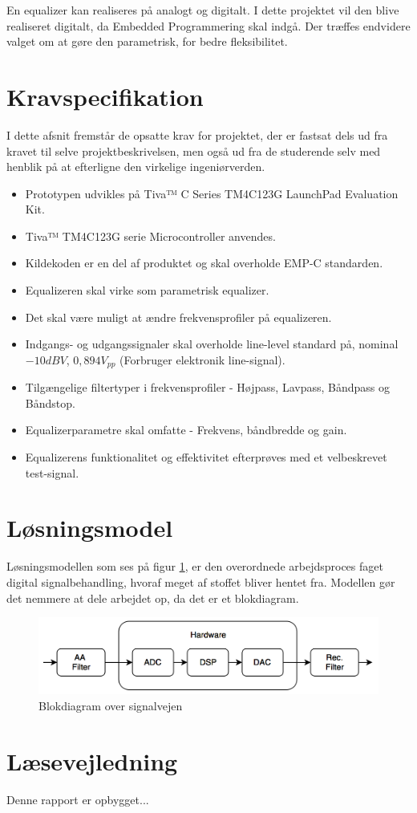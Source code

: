 En equalizer kan realiseres på analogt og digitalt. I dette projektet vil den blive realiseret digitalt, da Embedded Programmering skal indgå. Der træffes endvidere valget om at gøre den parametrisk, for bedre fleksibilitet. 



\section{Kravspecifikation} \label{afs:kravspecifikation}
I dette afsnit fremstår de opsatte krav for projektet, der er fastsat dels ud fra kravet til selve projektbeskrivelsen, men også ud fra de studerende selv med henblik på at efterligne den virkelige ingeniørverden.

\begin{itemize}
	\item Prototypen udvikles på Tiva™ C Series TM4C123G LaunchPad Evaluation Kit.
	\item Tiva™ TM4C123G serie Microcontroller anvendes.
	\item Kildekoden er en del af produktet og skal overholde EMP-C standarden.
	\item Equalizeren skal virke som parametrisk equalizer.
	\item Det skal være muligt at ændre frekvensprofiler på equalizeren.
	\item Indgangs- og udgangssignaler skal overholde line-level standard på, nominal $-10 dBV$, $0,894 V_{pp}$ (Forbruger elektronik line-signal).
	\item Tilgængelige filtertyper i frekvensprofiler - Højpass, Lavpass, Båndpass og Båndstop.
	\item Equalizerparametre skal omfatte - Frekvens, båndbredde og gain.
	\item Equalizerens funktionalitet og effektivitet efterprøves med et velbeskrevet test-signal.
\end{itemize}

\section{Løsningsmodel}
Løsningsmodellen som ses på figur \ref{fig:losningsmodel}, er den overordnede arbejdsproces faget digital signalbehandling, hvoraf meget af stoffet bliver hentet fra. Modellen gør det nemmere at dele arbejdet op, da det er et blokdiagram.

\begin{figure}[h]
	\centering
	\includegraphics[width=15cm]{billeder/flow_losn}
	\caption{Blokdiagram over signalvejen}
	\label{fig:losningsmodel}
\end{figure}

\section{Læsevejledning}
Denne rapport er opbygget...
